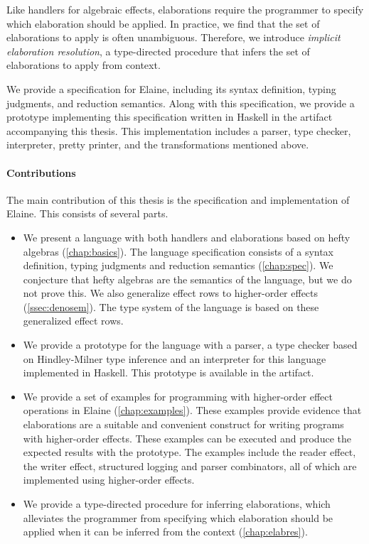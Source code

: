 Like handlers for algebraic effects, elaborations require the programmer to specify which elaboration should be applied. In practice, we find that the set of elaborations to apply is often unambiguous. Therefore, we introduce \emph{implicit elaboration resolution}, a type-directed procedure that infers the set of elaborations to apply from context.

We provide a specification for Elaine, including its syntax definition, typing judgments, and reduction semantics. Along with this specification, we provide a prototype implementing this specification written in Haskell in the artifact accompanying this thesis. This implementation includes a parser, type checker, interpreter, pretty printer, and the transformations mentioned above.

\paragraph{Contributions} The main contribution of this thesis is the specification and implementation of Elaine. This consists of several parts.
%
\begin{itemize}
    \item We present a language with both handlers and elaborations based on hefty algebras (\cref{chap:basics}). The language specification consists of a syntax definition, typing judgments and reduction semantics (\cref{chap:spec}). We conjecture that hefty algebras are the semantics of the language, but we do not prove this. We also generalize effect rows to higher-order effects (\cref{ssec:denosem}). The type system of the language is based on these generalized effect rows.
    \item We provide a prototype for the language with a parser, a type checker based on Hindley-Milner type inference and an interpreter for this language implemented in Haskell. This prototype is available in the artifact.
    \item We provide a set of examples for programming with higher-order effect operations in Elaine (\cref{chap:examples}). These examples provide evidence that elaborations are a suitable and convenient construct for writing programs with higher-order effects. These examples can be executed and produce the expected results with the prototype. The examples include the reader effect, the writer effect, structured logging and parser combinators, all of which are implemented using higher-order effects.
    \item We provide a type-directed procedure for inferring elaborations, which alleviates the programmer from specifying which elaboration should be applied when it can be inferred from the context (\cref{chap:elabres}).
\end{itemize}
